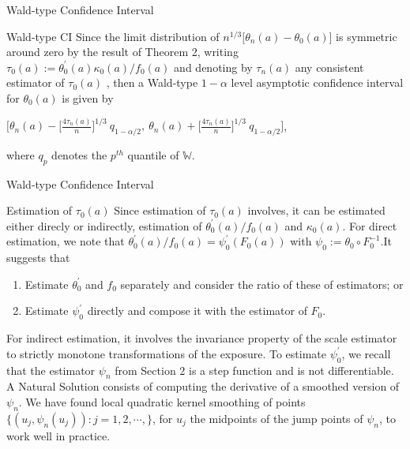 \documentclass{beamer}
\begin{document}


\begin{frame}{Wald-type Confidence Interval}

\begin{block}{Wald-type CI}
	Since the limit distribution of $n^{1/3} \Big[ \theta_n(a)-\theta_0(a) \Big]$ is symmetric around zero by the result of Theorem 2, writing $\tau_0(a):=\theta^{'}_0(a)\kappa_0(a)/f_0(a)$ and denoting by $\tau_n(a)$ any consistent estimator of $\tau_0(a)$ , then a Wald-type $1-\alpha$ level asymptotic confidence interval for $\theta_0(a)$ is given by
	\begin{center}
	$\Big[ \theta_n(a)-\Big[ \frac{4\tau_n(a)}{n} \Big]^{1/3} \ q_{1-\alpha /2}, \ \theta_n(a)+\Big[ \frac{4\tau_n(a)}{n} \Big]^{1/3} \ q_{1-\alpha /2}  \Bigg] $,
	\end{center}
	where $q_p$ denotes the $p^{th}$ quantile of $\mathbb{W}$.
\end{block}

\end{frame}


\begin{frame}{Wald-type Confidence Interval}

\begin{block}{Estimation of $\tau_0(a)$}
  Since estimation of $\tau_0(a)$ involves, it can be estimated either direcly or indirectly, estimation of $\theta^{'}_0(a)/f_0(a)$ and $\kappa_0(a)$.
  For direct estimation, we note that $\theta^{'}_0(a)/f_0(a)=\psi^{'}_0(F_0(a))$ with $\psi_0:=\theta_0 \circ F^{-1}_0$.It suggests that
  	\begin{enumerate}
  	\item Estimate $\theta^{'}_0$ and $f_0$ separately and consider the ratio of these of estimators; or
  	\item Estimate $\psi^{'}_0$ directly and compose it with the estimator of $F_0$.
  	\end{enumerate}

  For indirect estimation, it involves the invariance property of the scale estimator to strictly monotone transformations of the exposure. To estimate $\psi^{'}_0$, we recall that the estimator $\psi_n$ from Section 2 is a step function and is not differentiable. A Natural Solution consists of computing the derivative of a smoothed version of $\psi_n$. We have found local quadratic kernel smoothing of points $\lbrace (u_j,\psi_n(u_j)):j=1,2,\cdots,\rbrace$, for $u_j$ the midpoints of the jump points of $\psi_n$, to work well in practice.
\end{block}

\end{frame}
\end{document}
